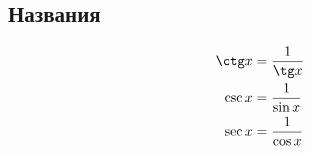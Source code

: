 \subsection*{Названия}
\begin{align*}
  \ctg x &= \frac{1}{\tg x}\\
  \csc x &= \frac{1}{\sin x}\\
  \sec x &= \frac{1}{\cos x}
\end{align*}

\hrulefill
